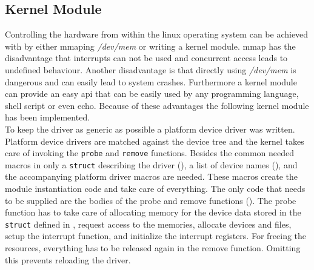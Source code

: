\documentclass[11pt,technote,a4paper,onecolumn,dvips]{IEEEtran}
\begin{document}
\subsection{Kernel Module}
Controlling the hardware from within the linux operating system can be
achieved with by either mmaping \emph{/dev/mem} or writing a kernel module.
mmap has the disadvantage that interrupts can not be used and concurrent
access leads to undefined behaviour. Another disadvantage is that directly
using \emph{/dev/mem} is dangerous and can easily lead to system crashes.
Furthermore a kernel module can provide an easy api that can be easily
used by any programming language, shell script or even echo. Because of
these advantages the following kernel module has been implemented.\\
To keep the driver as generic as possible a platform device driver was
written. Platform device drivers are matched against the device tree and
the kernel takes care of invoking the \lstinline+probe+ and
\lstinline+remove+ functions. Besides the common needed macros in
  only a \lstinline+struct+ describing the
driver (), a list of device names (),
and the accompanying platform driver macros  are needed.
These macros create the module instantiation code and take care of
everything. The only code that needs to be supplied are the bodies of
the probe and remove functions (). The probe function
has to take care of allocating memory for the device data stored in the
\lstinline+struct+ defined in , request access to the
memories, allocate devices and files, setup the interrupt function, and
initialize the interrupt registers. For freeing the resources, everything
has to be released again in the remove function. Omitting this prevents
reloading the driver.
\end{document}
